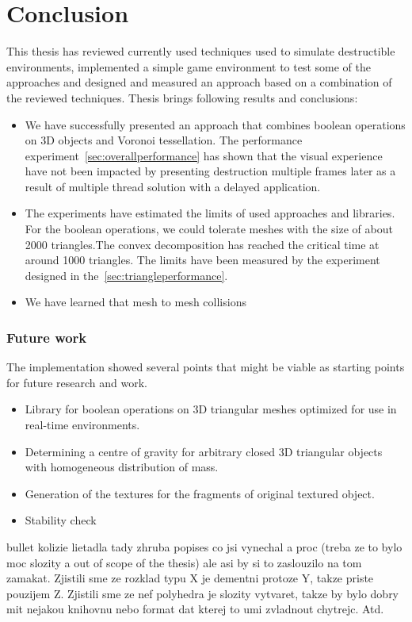 \chapter*{Conclusion}

This thesis has reviewed currently used techniques used to simulate destructible environments, implemented a simple game environment to test some of the approaches and designed and measured an approach based on a combination of the reviewed techniques. Thesis brings following results and conclusions:

\begin{itemize}
\item We have successfully presented an approach that combines boolean operations on 3D objects and Voronoi tessellation. The performance experiment~\cref{sec:overallperformance} has shown that the visual experience have not been impacted by presenting destruction multiple frames later as a result of multiple thread solution with a delayed application.

\item The experiments have estimated the limits of used approaches and libraries. 
For the boolean operations, we could tolerate meshes with the size of about 2000 triangles.The convex decomposition has reached the critical time at around 1000 triangles. The limits have been measured by the experiment designed in the~\cref{sec:triangleperformance}. 

\item We have learned that mesh to mesh collisions
\end{itemize}


\subsection*{Future work}
The implementation showed several points that might be viable as starting points for future research and work.
\begin{itemize}
\item Library for boolean operations on 3D triangular meshes optimized for use in real-time environments.
\item Determining a centre of gravity for arbitrary closed 3D triangular objects with homogeneous distribution of mass. 
\item Generation of the textures for the fragments of original textured object.
\item Stability check
\end{itemize}

bullet kolizie lietadla
tady zhruba popises co jsi vynechal a proc (treba ze to bylo moc slozity a out of scope of the thesis) ale asi by si to zaslouzilo na tom zamakat. Zjistili sme ze rozklad typu X je dementni protoze Y, takze priste pouzijem Z. Zjistili sme ze nef polyhedra je slozity vytvaret, takze by bylo dobry mit nejakou knihovnu nebo format dat kterej to umi zvladnout chytrejc. Atd.
